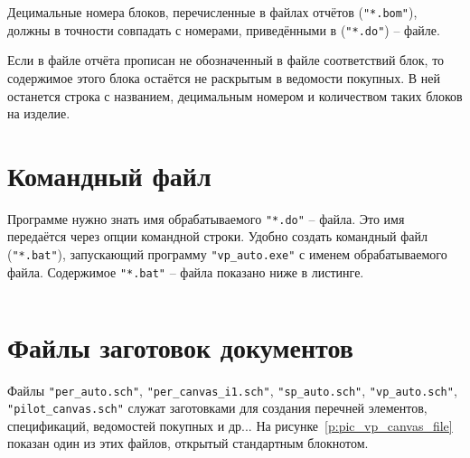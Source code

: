 Децимальные номера блоков, перечисленные в файлах отчётов (\verb|"*.bom"|), должны в точности совпадать с номерами, приведёнными в (\verb|"*.do"|) -- файле.

Если в файле отчёта прописан не обозначенный в файле соответствий блок, то содержимое этого блока остаётся не раскрытым в ведомости покупных. В ней останется строка с названием, децимальным номером и количеством таких блоков на изделие.




\section{Командный файл} \label{sec:comand_file}

Программе нужно знать имя обрабатываемого \verb|"*.do"| -- файла. Это имя передаётся
через опции командной строки. Удобно создать командный файл (\verb|"*.bat"|), запускающий программу \verb|"vp_auto.exe"| с именем обрабатываемого файла. Содержимое \verb|"*.bat"| -- файла показано ниже  в листинге.

\inputminted[fontsize=\small, linenos, breaklines, numbersep=2mm, xleftmargin=5mm, frame=single]{bat}{./VP_auto/inc/progect1.bat}




\section{Файлы заготовок документов}

Файлы \verb|"per_auto.sch"|, \verb|"per_canvas_i1.sch"|, \verb|"sp_auto.sch"|, \verb|"vp_auto.sch"|, \verb|"pilot_canvas.sch"|  служат заготовками для создания перечней элементов, спецификаций, ведомостей покупных и др... На рисунке~\ref{p:pic_vp_canvas_file} показан один из этих файлов, открытый стандартным блокнотом.

